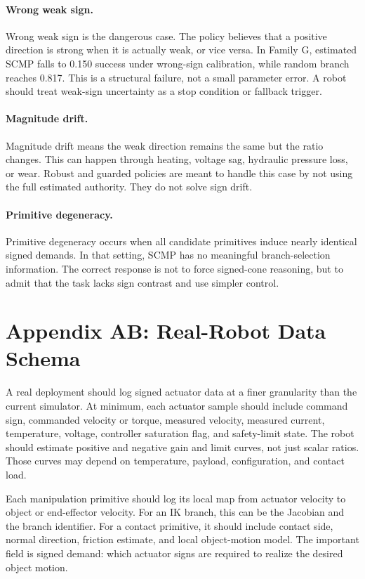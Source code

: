 \documentclass{article}
\begin{document}
\paragraph{Wrong weak sign.}
Wrong weak sign is the dangerous case. The policy believes that a positive direction is strong when it is actually weak, or vice versa. In Family G, estimated SCMP falls to 0.150 success under wrong-sign calibration, while random branch reaches 0.817. This is a structural failure, not a small parameter error. A robot should treat weak-sign uncertainty as a stop condition or fallback trigger.

\paragraph{Magnitude drift.}
Magnitude drift means the weak direction remains the same but the ratio changes. This can happen through heating, voltage sag, hydraulic pressure loss, or wear. Robust and guarded policies are meant to handle this case by not using the full estimated authority. They do not solve sign drift.

\paragraph{Primitive degeneracy.}
Primitive degeneracy occurs when all candidate primitives induce nearly identical signed demands. In that setting, SCMP has no meaningful branch-selection information. The correct response is not to force signed-cone reasoning, but to admit that the task lacks sign contrast and use simpler control.

\section*{Appendix AB: Real-Robot Data Schema}

A real deployment should log signed actuator data at a finer granularity than the current simulator. At minimum, each actuator sample should include command sign, commanded velocity or torque, measured velocity, measured current, temperature, voltage, controller saturation flag, and safety-limit state. The robot should estimate positive and negative gain and limit curves, not just scalar ratios. Those curves may depend on temperature, payload, configuration, and contact load.

Each manipulation primitive should log its local map from actuator velocity to object or end-effector velocity. For an IK branch, this can be the Jacobian and the branch identifier. For a contact primitive, it should include contact side, normal direction, friction estimate, and local object-motion model. The important field is signed demand: which actuator signs are required to realize the desired object motion.
\end{document}
